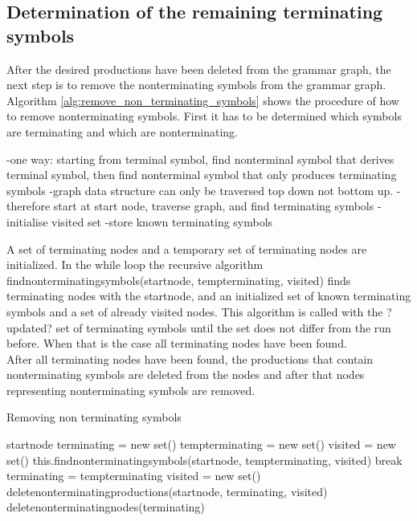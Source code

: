 \subsection{Determination of the remaining terminating symbols}
After the desired productions have been deleted from the grammar graph, the next step is to remove the nonterminating symbols from the grammar graph. Algorithm \ref{alg:remove_non_terminating_symbols} shows the procedure of how to remove nonterminating symbols.
First it has to be determined which symbols are terminating and which are nonterminating.

-one way: starting from terminal symbol, find nonterminal symbol that derives terminal symbol, then find nonterminal symbol that only produces terminating symbols
-graph data structure can only be traversed top down not bottom up.
-therefore start at start node, traverse graph, and find terminating symbols
-initialise visited set
-store known terminating symbols

A set of terminating nodes and a temporary set of terminating nodes are initialized.
In the while loop the recursive algorithm find\textunderscore non\textunderscore terminating\textunderscore symbols(start\textunderscore node, temp\textunderscore terminating, visited) finds terminating nodes with the start\textunderscore node, and an initialized set of known terminating symbols and a set of already visited nodes.
This algorithm is called with the ?updated? set of terminating symbols until the set does not differ from the run before.
When that is the case all terminating nodes have been found.\\
After all terminating nodes have been found, the productions that contain nonterminating symbols are deleted from the nodes and after that nodes representing nonterminating symbols are removed.

\begin{algorithm}[H]
\caption{Removing non terminating symbols}
\begin{algorithmic}[1] 
\Require start\textunderscore node
\State terminating = new set()
\State temp\textunderscore terminating = new set()
	\State visited = new set()
	\State this.find\textunderscore non\textunderscore terminating\textunderscore symbols(start\textunderscore node, temp\textunderscore terminating, visited)
		\State break
	\Else
		\State terminating = temp\textunderscore terminating
	\EndIf
\EndWhile
\State visited = new set() 
\State delete\textunderscore non\textunderscore terminating\textunderscore productions(start\textunderscore node, terminating, visited)
\State delete\textunderscore non\textunderscore terminating\textunderscore nodes(terminating)
\end{algorithmic}
\label{alg:remove_non_terminating_symbols}
\end{algorithm}


